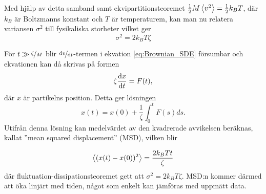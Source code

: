 Med hjälp av detta samband samt ekvipartitionsteoremet $\frac{1}{2}M\ev{v^2}=\frac{1}{2}k_BT$, där $k_B$ är Boltzmanns konstant och $T$ är temperaturem, kan man nu relatera variansen $\sigma^2$ till fysikaliska storheter vilket ger 
\begin{equation}
    \sigma^2 = 2k_BT\zeta
\end{equation}


För $t \gg \nicefrac{\zeta}{M}$ blir $\nicefrac{\dd{v}}{\dd{t}}$-termen i ekvation \eqref{eq:Brownian_SDE} försumbar  och ekvationen kan då skrivas på formen
\begin{equation}
    \zeta \dv{x}{t}=F(t),
\end{equation}
där $x$ är partikelns position. Detta ger lösningen
\begin{equation}
    x(t)=x(0)+\frac{1}{\zeta} \int^t_0 F(s)ds.
\end{equation}
Utifrån denna lösning kan medelvärdet av den kvadrerade avvikelsen beräknas, kallat ''mean squared displacement'' (MSD), vilken blir 

\begin{equation}
    \ev{(x(t)-x(0))^2}=\frac{2k_BTt}{\zeta}
\end{equation}
där fluktuation-dissipationsteoremet gett att $\sigma^2=2k_BT\zeta$.  MSD:n kommer därmed att öka linjärt med tiden, något som enkelt kan jämföras med uppmätt data.




